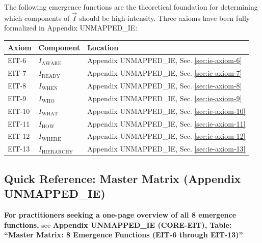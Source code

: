 \begin{tcolorbox}[colback=red!5!white, colframe=red!75!black,
    title=\textbf{Foundation: Theory in Appendix UNMAPPED_IE (CORE-EIT)}]

The following emergence functions are the theoretical foundation for determining which components of $\vec{I}$ should be high-intensity. Three axioms have been fully formalized in Appendix UNMAPPED_IE:

\begin{center}
\renewcommand{\arraystretch}{1.3}
\begin{tabular}{@{}lll@{}}
\toprule
\textbf{Axiom} & \textbf{Component} & \textbf{Location} \\
\midrule
EIT-6 & $I_{\text{AWARE}}$ & Appendix UNMAPPED_IE, Sec. \ref{sec:ie-axiom-6} \\
EIT-7 & $I_{\text{READY}}$ & Appendix UNMAPPED_IE, Sec. \ref{sec:ie-axiom-7} \\
EIT-8 & $I_{\text{WHEN}}$ & Appendix UNMAPPED_IE, Sec. \ref{sec:ie-axiom-8} \\
EIT-9 & $I_{\text{WHO}}$ & Appendix UNMAPPED_IE, Sec. \ref{sec:ie-axiom-9} \\
EIT-10 & $I_{\text{WHAT}}$ & Appendix UNMAPPED_IE, Sec. \ref{sec:ie-axiom-10} \\
EIT-11 & $I_{\text{HOW}}$ & Appendix UNMAPPED_IE, Sec. \ref{sec:ie-axiom-11} \\
EIT-12 & $I_{\text{WHERE}}$ & Appendix UNMAPPED_IE, Sec. \ref{sec:ie-axiom-12} \\
EIT-13 & $I_{\text{HIERARCHY}}$ & Appendix UNMAPPED_IE, Sec. \ref{sec:ie-axiom-13} \\
\bottomrule
\end{tabular}
\end{center}

\end{tcolorbox}

\subsection{Quick Reference: Master Matrix (Appendix UNMAPPED_IE)}

\textbf{For practitioners seeking a one-page overview of all 8 emergence functions,} see \textbf{Appendix UNMAPPED_IE (CORE-EIT), Table: ``Master Matrix: 8 Emergence Functions (EIT-6 through EIT-13)''}

